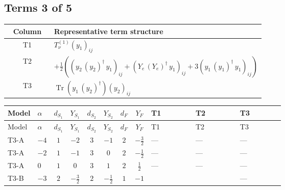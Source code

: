 \documentclass[8pt]{article}
\begin{document}
\begin{landscape}
\subsection*{Terms 3 of 5}
\begin{center}
\begin{tabular}{@{}c >{\raggedright\arraybackslash}p{0.82\linewidth}@{}}
\toprule
Column & Representative term structure \\
\midrule
T1 & \(\displaystyle T_{\nu}^{(1)} \left({y_1}\right)_{ij}\) \\
\midrule
T2 & \(\displaystyle +\frac{1}{2} (\left({y_2}\,\left({y_2}\right)^{\dagger}\,{y_1}\right)_{ij}+\left({Y_e}\,\left({Y_e}\right)^{\dagger}\,{y_1}\right)_{ij}+3 \left({y_1}\,\left({y_1}\right)^{\dagger}\,{y_1}\right)_{ij})\) \\
\midrule
T3 & \(\displaystyle \operatorname{Tr}\!\left({y_1}\,\left({y_2}\right)^{\dagger}\right) \left({y_2}\right)_{ij}\) \\
\midrule
\bottomrule
\end{tabular}
\end{center}
\smallskip
\tiny
\begin{longtable}{@{}llcccccc >{\raggedright\arraybackslash}p{0.21\linewidth} >{\raggedright\arraybackslash}p{0.21\linewidth} >{\raggedright\arraybackslash}p{0.21\linewidth}@{}}
\toprule
Model & $\alpha$ & $d_{S_1}$ & $Y_{S_1}$ & $d_{S_2}$ & $Y_{S_2}$ & $d_F$ & $Y_F$ & T1 & T2 & T3 \\
\midrule
\endfirsthead
\toprule
Model & $\alpha$ & $d_{S_1}$ & $Y_{S_1}$ & $d_{S_2}$ & $Y_{S_2}$ & $d_F$ & $Y_F$ & T1 & T2 & T3 \\
\midrule
\endhead
T3-A & $-4$ & $1$ & $-2$ & $3$ & $-1$ & $2$ & $-\frac{3}{2}$ & --- & --- & --- \\
\midrule
T3-A & $-2$ & $1$ & $-1$ & $3$ & $0$ & $2$ & $-\frac{1}{2}$ & --- & --- & --- \\
\midrule
T3-A & $0$ & $1$ & $0$ & $3$ & $1$ & $2$ & $\frac{1}{2}$ & --- & --- & --- \\
\midrule
T3-B & $-3$ & $2$ & $-\frac{3}{2}$ & $2$ & $-\frac{1}{2}$ & $1$ & $-1$ & \scriptsize\adjustbox{max width=\linewidth}{$\begin{gathered} T_{\nu}^{(1)} \left({y_1}\right)_{ij}\end{gathered}$} & \scriptsize\adjustbox{max width=\linewidth}{$\begin{gathered} +\frac{1}{2} (\left({y_2}\,\left({y_2}\right)^{\dagger}\,{y_1}\right)_{ij}+\left({Y_e}\,\left({Y_e}\right)^{\dagger}\,{y_1}\right)_{ij}+3 \left({y_1}\,\left({y_1}\right)^{\dagger}\,{y_1}\right)_{ij})\end{gathered}$} & --- \\

\end{longtable}
\end{landscape}
\end{document}
